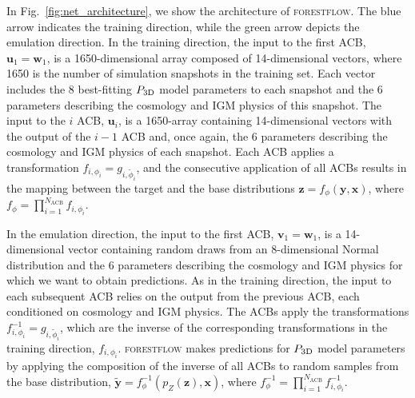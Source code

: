 \documentclass{aa}
\newcommand{\pthreed}{\ensuremath{P_{\rm 3D}}\xspace}
\newcommand{\forestflow}{\textsc{forestflow}\xspace}
\begin{document}
In Fig.~\ref{fig:net_architecture}, we show the architecture of \forestflow. The blue arrow indicates the training direction, while the green arrow depicts the emulation direction. In the training direction, the input to the first ACB, $\mathbf{u}_1=\mathbf{w}_1$, is a 1650-dimensional array composed of 14-dimensional vectors, where 1650 is the number of simulation snapshots in the training set. Each vector includes the 8 best-fitting \pthreed model parameters to each snapshot and the 6 parameters describing the cosmology and IGM physics of this snapshot. The input to the $i$ ACB, $\mathbf{u}_i$, is a 1650-array containing 14-dimensional vectors with the output of the $i-1$ ACB and, once again, the 6 parameters describing the cosmology and IGM physics of each snapshot. Each ACB applies a transformation $f_{i,\phi_i}=g_{i,\tilde{\phi}_i}$, and the consecutive application of all ACBs results in the mapping between the target and the base distributions $\mathbf{z}=f_\phi(\mathbf{y}, \mathbf{x})$, where $f_\phi = \prod_{i=1}^{N_\mathrm{ACB}} f_{i,\phi_i}$.

In the emulation direction, the input to the first ACB, $\mathbf{v}_1=\mathbf{w}_1$, is a 14-dimensional vector containing random draws from an 8-dimensional Normal distribution and the 6 parameters describing the cosmology and IGM physics for which we want to obtain predictions. As in the training direction, the input to each subsequent ACB relies on the output from the previous ACB, each conditioned on cosmology and IGM physics. The ACBs apply the transformations $f^{-1}_{i,\phi_i}=g_{i,\tilde{\phi}_i}$, which are the inverse of the corresponding transformations in the training direction, $f_{i,\phi_i}$. \forestflow makes predictions for \pthreed model parameters by applying the composition of the inverse of all ACBs to random samples from the base distribution, $\mathbf{\tilde{y}}=f_\phi^{-1}(p_{Z}(\mathbf{z}), \mathbf{x})$, where $f_\phi^{-1} = \prod_{i=1}^{N_\mathrm{ACB}} f_{i,\phi_i}^{-1}$.
\end{document}
